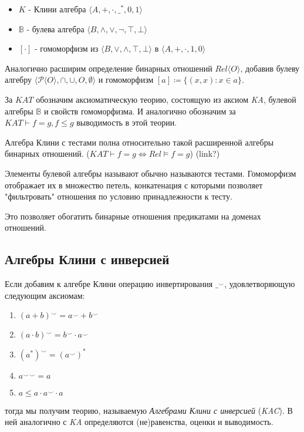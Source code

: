 \documentclass[times
              ]{itmo-student-thesis}
\begin{document}
      \begin{itemize}
        \item $K$ - Клини алгебра $\langle A, +, \cdot, \_^*, 0, 1 \rangle $
        \item $\mathbb{B}$ - булева алгебра $\langle B, \wedge, \vee, \neg, \top, \bot \rangle $
        \item $[\cdot]$ - гомоморфизм из
          $\langle B, \vee, \wedge, \top, \bot \rangle$
        в $\langle A, +,     \cdot, 1,    0 \rangle$
      \end{itemize}

      Аналогично расширим определение бинарных отношений $Rel \langle O \rangle $, добавив булеву алгебру $\langle \mathcal{P}\langle O \rangle, \cap, \cup, O, \emptyset \rangle$ и гомоморфизм $ [a] \coloneqq \{(x, x): x \in a\} $.

      За $ \mathit{KAT} $ обозначим аксиоматическую теорию, состоящую из аксиом \textit{KA}, булевой алгебры $ \mathbb{B}$ и свойств гомоморфизма. И аналогично обозначим за $ KAT \vdash f = g, f \leq g $ выводимость в этой теории.

      Алгебра Клини с тестами полна относительно такой расширенной алгебры бинарных отношений.
      ($\mathit{KAT} \vdash f = g \Leftrightarrow \mathit{Rel} \models f = g$) (link?)

      Элементы булевой алгебры называют обычно называются тестами.
      Гомоморфизм отображает их в множество петель, конкатенация с которыми позволяет "фильтровать" отношения по условию принадлежности к тесту.

      Это позволяет обогатить бинарные отношения предикатами на доменах отношений.

    \subsection{Алгебры Клини с инверсией}
      Если добавим к алгебре Клини операцию инвертирования $ \_^{\smile} $, удовлетворяющую следующим аксиомам:
      \begin{enumerate}
        \item $ (a + b)^{\smile} = a^{\smile} + b^{\smile} $
        \item $ (a \cdot b)^{\smile} = b^{\smile} \cdot a^{\smile} $
        \item $ (a^*)^{\smile} = (a^{\smile})^* $
        \item $ {a^{\smile}}^{\smile} = a $
        \item $ a \leq a \cdot a^{\smile} \cdot a $
      \end{enumerate}
    тогда мы получим теорию, называемую \textit{Алгебрами Клини с инверсией} (\textit{KAC}).
    В ней аналогично с \textit{KA} определяются (не)равенства, оценки и выводимость.
\end{document}
